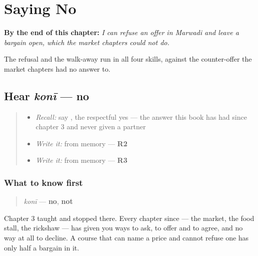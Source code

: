 
\chapter{Saying No}
\label{ch:mw-saying-no}

\begin{chapteropening}
\textbf{By the end of this chapter:} \emph{I can refuse an offer in Marwadi and leave a bargain open, which the market chapters could not do.}

The refusal and the walk-away run in all four skills, against the counter-offer the market chapters had no answer to.
\end{chapteropening}

\section[konī]{Hear \emph{konī} — no}

\label{lesson:MW-C39-hear-koni}



\begin{quote}
\begin{itemize}
\raggedright
  \item \emph{Recall:} say \textbf{ }, the respectful yes — the answer this book has had since chapter 3 and never given a partner
  \item \emph{Write it:} \textbf{} from memory — \textbf{R2}
  \item \emph{Write it:} \textbf{} from memory — \textbf{R3}
\end{itemize}
\end{quote}

\subsection*{What to know first}
\begin{quote}
\emph{konī} — \textbf{no}, \textbf{not}
\end{quote}

Chapter 3 taught \textbf{ } and stopped there. Every chapter since — the market, the food stall, the rickshaw — has given you ways to ask, to offer and to agree, and no way at all to decline. A course that can name a price and cannot refuse one has only half a bargain in it.

